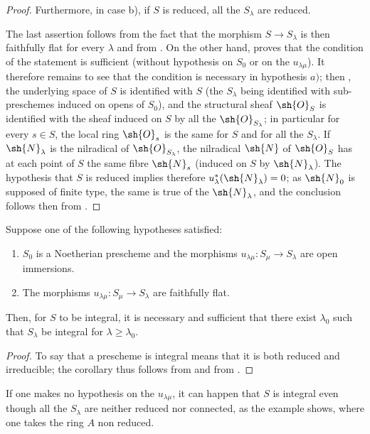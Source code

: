 \begin{proof}
Furthermore, in case b), if $S$ is reduced, all the $S_\lambda$ are reduced.

The last assertion follows from the fact that the morphism $S\to S_\lambda$ is then faithfully flat for every $\lambda$  and from .
On the other hand,  proves that the condition of the statement is sufficient (without hypothesis on $S_0$ or on the $u_{\lambda\mu}$).
It therefore remains to see that the condition is necessary in hypothesis $a)$; then , the underlying space of $S$ is identified with $S$ (the $S_\lambda$ being identified with sub-preschemes induced on opens of $S_0$), and the structural sheaf $\sh{O}_S$ is identified with
the sheaf induced on $S$ by all the $\sh{O}_{S_\lambda}$; in particular for every $s\in S$, the local ring $\sh{O}_s$ is the same for $S$ and for all the $S_\lambda$.
If $\sh{N}_\lambda$ is the nilradical of $\sh{O}_{S_\lambda}$, the nilradical $\sh{N}$ of $\sh{O}_S$ has at each point of $S$ the same fibre $\sh{N}_s$ (induced on $S$ by $\sh{N}_\lambda$).
The hypothesis that $S$ is reduced implies therefore $u_\lambda^*(\sh{N}_\lambda)=0$; as $\sh{N}_0$ is supposed of finite type, the same is true of the $\sh{N}_\lambda$, and the conclusion follows then from .
\end{proof}

\begin{corollary}[8.7.3]
\label{IV.8.7.3}
Suppose one of the following hypotheses satisfied:
\begin{enumerate}[label=\emph{\alph*)}]
\item $S_0$ is a Noetherian prescheme and the morphisms $u_{\lambda\mu}:S_\mu\to S_\lambda$ are open immersions.
\item The morphisms $u_{\lambda\mu}:S_\mu\to S_\lambda$ are faithfully flat.
\end{enumerate}
Then, for $S$ to be integral, it is necessary and sufficient that there exist $\lambda_0$ such that $S_\lambda$ be integral for $\lambda\geqslant\lambda_0$.
\end{corollary}

\begin{proof}
To say that a prescheme is integral means that it is both reduced and irreducible; the corollary thus follows from  and from .
\end{proof}

\begin{remark}[8.7.4]
\label{IV.8.7.4}
If one makes no hypothesis on the $u_{\lambda\mu}$, it can happen that $S$ is integral even though all the $S_\lambda$ are neither reduced nor connected, as the example  shows, where one takes the ring $A$ non reduced.
\end{remark}

